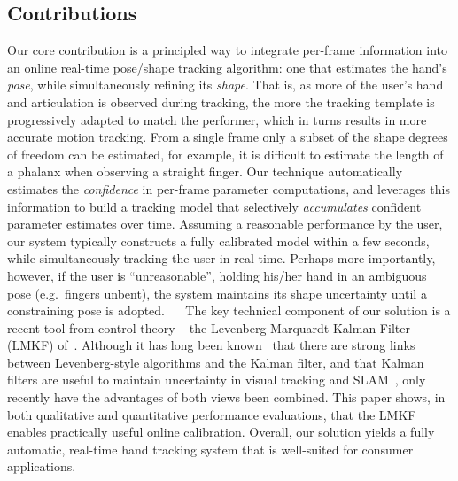 \subsection*{Contributions}
Our core contribution is a principled way to integrate per-frame information into an online real-time pose/shape tracking algorithm: one that estimates the hand's \emph{pose}, while simultaneously refining its \emph{shape}. That is, as more of the user's hand and articulation is observed during tracking, the more the tracking template is progressively adapted to match the performer, which in turns results in more accurate motion tracking. 
From a single frame only a subset of the shape degrees of freedom can be estimated, for example, it is difficult to estimate the length of a phalanx when observing a straight finger.
Our technique automatically estimates the \emph{confidence} in per-frame parameter computations, and leverages this information to build a tracking model that selectively \emph{accumulates} confident parameter estimates over time. Assuming a reasonable performance by the user, our system typically constructs a fully calibrated model within a few seconds, while simultaneously tracking the user in real time.  Perhaps more importantly, however, if the user is ``unreasonable'', holding his/her hand in an ambiguous pose (e.g.~fingers unbent), the system maintains its shape uncertainty until a constraining pose is adopted.
$\quad$
The key technical component of our solution is a recent tool from control theory -- the Levenberg-Marquardt Kalman Filter (LMKF) of~\cite{skoglund2015extended}.  Although it has long been known~\cite{bell1993iterated,bellaire1995new} that there are strong links between Levenberg-style algorithms and the Kalman filter, and that Kalman filters are useful to maintain uncertainty in visual tracking and SLAM~\cite{strasdat2012visual}, only recently have the advantages of both views been combined.   This paper shows, in both qualitative and quantitative performance evaluations, that the LMKF enables practically useful online calibration.
Overall, our solution yields a fully automatic, real-time hand tracking system that is well-suited for consumer applications.
